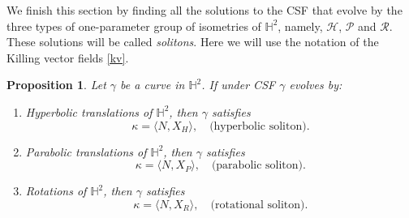 \documentclass[12pt]{amsart}
\theoremstyle{plain}
\newtheorem{proposition}[theorem]{Proposition}
\theoremstyle{definition}
\def\h{\mathbb H}
\begin{document}
We finish this section by finding  all the solutions to the CSF that evolve by the three types of one-parameter group of isometries of $\h^2$, namely, $\mathcal{H}$, $\mathcal{P}$ and $\mathcal{R}$.  These solutions will be called {\it solitons}. Here we will use the notation of the Killing vector fields \eqref{kv}.

 
\begin{proposition} \label{prs}
Let $\gamma $ be a curve in $\h^2$.  If under CSF $\gamma$ evolves by:
\begin{enumerate}
\item Hyperbolic translations of  $\h^2$, then $\gamma$ satisfies
\begin{equation}\label{sh}
\kappa=\langle N,X_H\rangle,\quad \mbox{(hyperbolic soliton)}.
\end{equation}

\item Parabolic translations of  $\h^2$, then $\gamma$ satisfies  
\begin{equation}\label{sh2}
\kappa=\langle N,X_P\rangle,\quad \mbox{(parabolic soliton)}.
\end{equation}

\item Rotations of  $\h^2$, then $\gamma$ satisfies
\begin{equation}\label{sh3}
\kappa= \langle N,X_R\rangle,\quad \mbox{(rotational soliton)}.
\end{equation}
\end{enumerate}
\end{proposition}
\end{document}

